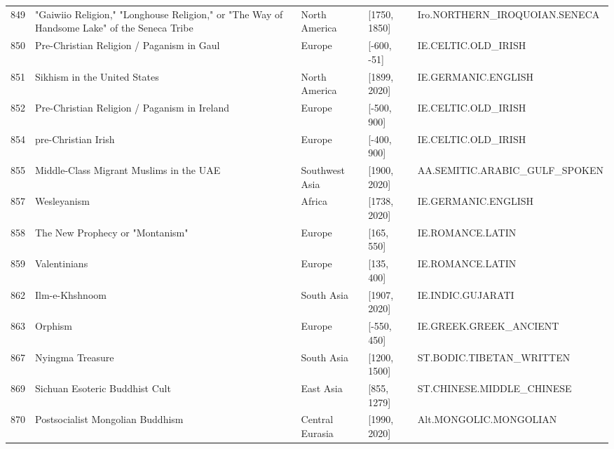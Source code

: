 {\begin{longtable}{rp{3.5cm}llp{3.5cm}}
849 & {\raggedright "Gaiwiio Religion," "Longhouse Religion," or "The Way of Handsome Lake" of the Seneca Tribe} & North America & [1750, 1850] & {\raggedright Iro.\allowbreak{}NORTHERN\_\allowbreak{}IROQUOIAN.\allowbreak{}SENECA} \\
850 & {\raggedright Pre-Christian Religion / Paganism in Gaul} & Europe & [-600, -51] & {\raggedright IE.\allowbreak{}CELTIC.\allowbreak{}OLD\_\allowbreak{}IRISH} \\
851 & {\raggedright Sikhism in the United States} & North America & [1899, 2020] & {\raggedright IE.\allowbreak{}GERMANIC.\allowbreak{}ENGLISH} \\
852 & {\raggedright Pre-Christian Religion / Paganism in Ireland} & Europe & [-500, 900] & {\raggedright IE.\allowbreak{}CELTIC.\allowbreak{}OLD\_\allowbreak{}IRISH} \\
854 & {\raggedright pre-Christian Irish} & Europe & [-400, 900] & {\raggedright IE.\allowbreak{}CELTIC.\allowbreak{}OLD\_\allowbreak{}IRISH} \\
855 & {\raggedright Middle-Class Migrant Muslims in the UAE} & Southwest Asia & [1900, 2020] & {\raggedright AA.\allowbreak{}SEMITIC.\allowbreak{}ARABIC\_\allowbreak{}GULF\_\allowbreak{}SPOKEN} \\
857 & {\raggedright Wesleyanism} & Africa & [1738, 2020] & {\raggedright IE.\allowbreak{}GERMANIC.\allowbreak{}ENGLISH} \\
858 & {\raggedright The New Prophecy or "Montanism"} & Europe & [165, 550] & {\raggedright IE.\allowbreak{}ROMANCE.\allowbreak{}LATIN} \\
859 & {\raggedright Valentinians} & Europe & [135, 400] & {\raggedright IE.\allowbreak{}ROMANCE.\allowbreak{}LATIN} \\
862 & {\raggedright Ilm-e-Khshnoom} & South Asia & [1907, 2020] & {\raggedright IE.\allowbreak{}INDIC.\allowbreak{}GUJARATI} \\
863 & {\raggedright Orphism} & Europe & [-550, 450] & {\raggedright IE.\allowbreak{}GREEK.\allowbreak{}GREEK\_\allowbreak{}ANCIENT} \\
867 & {\raggedright Nyingma Treasure} & South Asia & [1200, 1500] & {\raggedright ST.\allowbreak{}BODIC.\allowbreak{}TIBETAN\_\allowbreak{}WRITTEN} \\
869 & {\raggedright Sichuan Esoteric Buddhist Cult} & East Asia & [855, 1279] & {\raggedright ST.\allowbreak{}CHINESE.\allowbreak{}MIDDLE\_\allowbreak{}CHINESE} \\
870 & {\raggedright Postsocialist Mongolian Buddhism} & Central Eurasia & [1990, 2020] & {\raggedright Alt.\allowbreak{}MONGOLIC.\allowbreak{}MONGOLIAN} \\

\end{longtable}}
